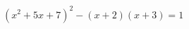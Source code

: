 \begin{ex}[type=equation]
	\begin{condition}
		$\left(x^2 + 5x + 7\right)^2 -  (x + 2)(x + 3) = 1$
	\end{condition}
\end{ex}